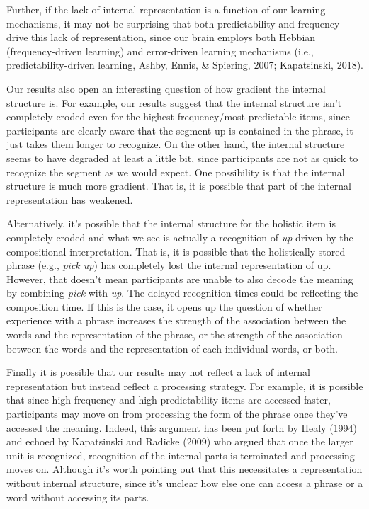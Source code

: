 \documentclass[
  man,floatsintext]{apa6}
\begin{document}
Further, if the lack of internal representation is a function of our learning mechanisms, it may not be surprising that both predictability and frequency drive this lack of representation, since our brain employs both Hebbian (frequency-driven learning) and error-driven learning mechanisms (i.e., predictability-driven learning, Ashby, Ennis, \& Spiering, 2007; Kapatsinski, 2018).

Our results also open an interesting question of how gradient the internal structure is. For example, our results suggest that the internal structure isn't completely eroded even for the highest frequency/most predictable items, since participants are clearly aware that the segment up is contained in the phrase, it just takes them longer to recognize. On the other hand, the internal structure seems to have degraded at least a little bit, since participants are not as quick to recognize the segment as we would expect. One possibility is that the internal structure is much more gradient. That is, it is possible that part of the internal representation has weakened.

Alternatively, it's possible that the internal structure for the holistic item is completely eroded and what we see is actually a recognition of \emph{up} driven by the compositional interpretation. That is, it is possible that the holistically stored phrase (e.g., \emph{pick up}) has completely lost the internal representation of up. However, that doesn't mean participants are unable to also decode the meaning by combining \emph{pick} with \emph{up}. The delayed recognition times could be reflecting the composition time. If this is the case, it opens up the question of whether experience with a phrase increases the strength of the association between the words and the representation of the phrase, or the strength of the association between the words and the representation of each individual words, or both.

Finally it is possible that our results may not reflect a lack of internal representation but instead reflect a processing strategy. For example, it is possible that since high-frequency and high-predictability items are accessed faster, participants may move on from processing the form of the phrase once they've accessed the meaning. Indeed, this argument has been put forth by Healy (1994) and echoed by Kapatsinski and Radicke (2009) who argued that once the larger unit is recognized, recognition of the internal parts is terminated and processing moves on. Although it's worth pointing out that this necessitates a representation without internal structure, since it's unclear how else one can access a phrase or a word without accessing its parts.
\end{document}
